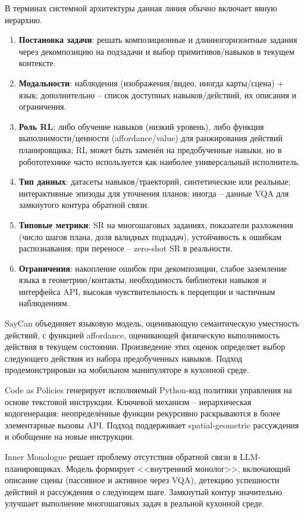     В терминах системной архитектуры данная линия обычно включает явную иерархию.
    \begin{enumerate}
        \item \textbf{Постановка задачи}: решать композиционные и длинногоризонтные задания через декомпозицию на подзадачи и выбор примитивов/навыков в текущем контексте.
        \item \textbf{Модальности}: наблюдения (изображения/видео, иногда карты/сцена) + язык; дополнительно -- список доступных навыков/действий, их описания и ограничения.
        \item \textbf{Роль RL}: либо обучение навыков (низкий уровень), либо функция выполнимости/ценности (affordance/value) для ранжирования действий планировщика; RL может быть заменён на предобученные навыки, но в робототехнике часто используется как наиболее универсальный исполнитель.
        \item \textbf{Тип данных}: датасеты навыков/траекторий, синтетические или реальные; интерактивные эпизоды для уточнения планов; иногда -- данные VQA для замкнутого контура обратной связи.
        \item \textbf{Типовые метрики}: SR на многошаговых заданиях, показатели разложения (число шагов плана, доля валидных подзадач), устойчивость к ошибкам распознавания; при переносе -- zero-shot SR в реальности.
        \item \textbf{Ограничения}: накопление ошибок при декомпозиции, слабое заземление языка в геометрию/контакты, необходимость библиотеки навыков и интерфейса API, высокая чувствительность к перцепции и частичным наблюдениям.
    \end{enumerate}

    SayCan \cite{ahn2022saycan} объединяет языковую модель, оценивающую семантическую уместность действий, с функцией affordance, оценивающей физическую выполнимость действия в текущем состоянии. Произведение этих оценок определяет выбор следующего действия из набора предобученных навыков. Подход продемонстрирован на мобильном манипуляторе в кухонной среде.

    Code as Policies \cite{liang2023code} генерирует исполняемый Python-код политики управления на основе текстовой инструкции. Ключевой механизм -- иерархическая кодогенерация: неопределённые функции рекурсивно раскрываются в более элементарные вызовы API. Подход поддерживает spatial-geometric рассуждения и обобщение на новые инструкции.

    Inner Monologue \cite{huang2023inner} решает проблему отсутствия обратной связи в LLM-планировщиках. Модель формирует <<внутренний монолог>>, включающий описание сцены (пассивное и активное через VQA), детекцию успешности действий и рассуждения о следующем шаге. Замкнутый контур значительно улучшает выполнение многошаговых задач в реальной кухонной среде.

